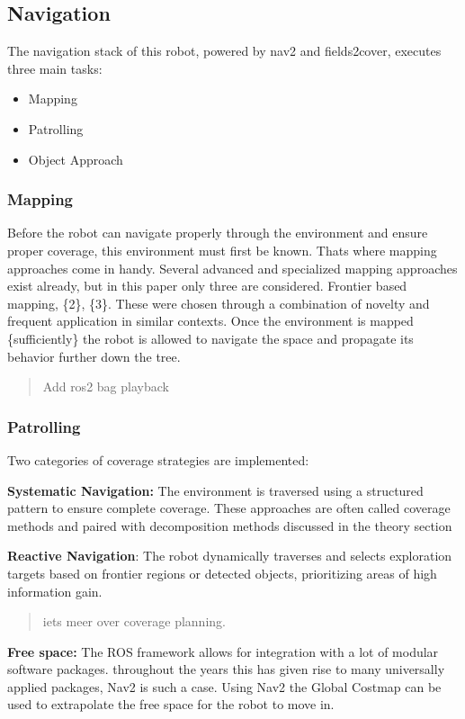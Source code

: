 \subsection{Navigation}

The navigation stack of this robot, powered by nav2 and fields2cover, executes three main tasks:

\begin{itemize}
\item Mapping
\item Patrolling
\item Object Approach
\end{itemize}

\subsubsection{Mapping}

Before the robot can navigate properly through the environment and ensure proper coverage, this environment must first be known. Thats where mapping approaches come in handy. Several advanced and specialized mapping approaches exist already, but in this paper only three are considered. Frontier based mapping, \{2\}, \{3\}. These were chosen through a combination of novelty and frequent application in similar contexts. Once the environment is mapped \{sufficiently\} the robot is allowed to navigate the space and propagate its behavior further down the tree.

\begin{quote}
Add ros2 bag playback
\end{quote}

\subsubsection{Patrolling}

Two categories of coverage strategies are implemented:

\textbf{Systematic Navigation:} The environment is traversed using a structured pattern to ensure complete coverage. These approaches are often called coverage methods and paired with decomposition methods discussed in the theory section

\textbf{Reactive Navigation}: The robot dynamically traverses and selects exploration targets based on frontier regions or detected objects, prioritizing areas of high information gain.

\begin{quote}
iets meer over coverage planning.
\end{quote}

\textbf{Free space:}
The ROS framework allows for integration with a lot of modular software packages. throughout the years this has given rise to many universally applied packages, Nav2 is such a case.
Using Nav2 the Global Costmap can be used to extrapolate the free space for the robot to move in.